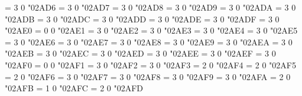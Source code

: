 \Umathchardef\supsup = 3 0 "02AD6 %
\Umathchardef\suphsub = 3 0 "02AD7 %
\Umathchardef\supdsub = 3 0 "02AD8 %
\Umathchardef\forkv = 3 0 "02AD9 %
\Umathchardef\topfork = 3 0 "02ADA %
\Umathchardef\mlcp = 3 0 "02ADB %
\Umathchardef\forks = 3 0 "02ADC %
\Umathchardef\forksnot = 3 0 "02ADD %
\Umathchardef\shortlefttack = 3 0 "02ADE %
\Umathchardef\shortdowntack = 3 0 "02ADF %
\Umathchardef\shortuptack = 3 0 "02AE0 %
\Umathchardef\perps = 0 0 "02AE1 %
\Umathchardef\vDdash = 3 0 "02AE2 %
\Umathchardef\dashV = 3 0 "02AE3 %
\Umathchardef\Dashv = 3 0 "02AE4 %
\Umathchardef\DashV = 3 0 "02AE5 %
\Umathchardef\varVdash = 3 0 "02AE6 %
\Umathchardef\Barv = 3 0 "02AE7 %
\Umathchardef\vBar = 3 0 "02AE8 %
\Umathchardef\vBarv = 3 0 "02AE9 %
\Umathchardef\barV = 3 0 "02AEA %
\Umathchardef\Vbar = 3 0 "02AEB %
\Umathchardef\Not = 3 0 "02AEC %
\Umathchardef\bNot = 3 0 "02AED %
\Umathchardef\revnmid = 3 0 "02AEE %
\Umathchardef\cirmid = 3 0 "02AEF %
\Umathchardef\midcir = 3 0 "02AF0 %
\Umathchardef\topcir = 0 0 "02AF1 %
\Umathchardef\nhpar = 3 0 "02AF2 %
\Umathchardef\parsim = 3 0 "02AF3 %
\Umathchardef\interleave = 2 0 "02AF4 %
\Umathchardef\nhVvert = 2 0 "02AF5 %
\Umathchardef\threedotcolon = 2 0 "02AF6 %
\Umathchardef\lllnest = 3 0 "02AF7 %
\Umathchardef\gggnest = 3 0 "02AF8 %
\Umathchardef\leqqslant = 3 0 "02AF9 %
\Umathchardef\geqqslant = 3 0 "02AFA %
\Umathchardef\trslash = 2 0 "02AFB %
\Umathchardef\biginterleave = 1 0 "02AFC %
\Umathchardef\sslash = 2 0 "02AFD %
